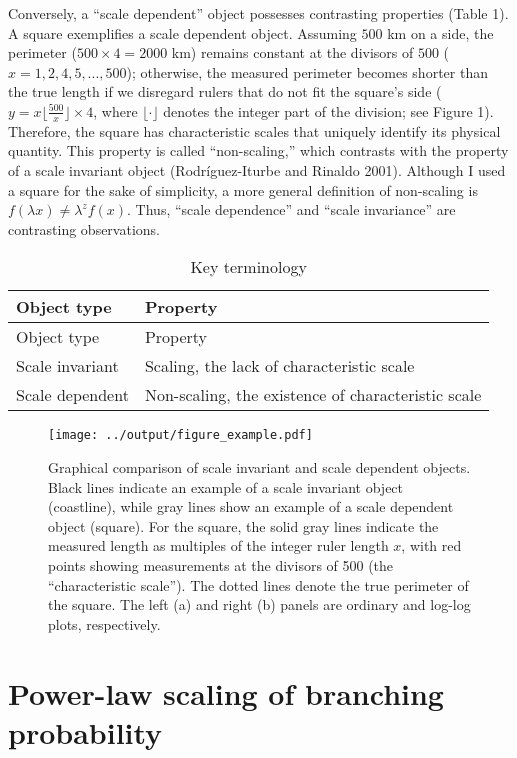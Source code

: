 \documentclass[
  12pt,
]{article}
\begin{document}
Conversely, a ``scale dependent'' object possesses contrasting properties (Table 1). A square exemplifies a scale dependent object. Assuming \(500\) km on a side, the perimeter (\(500 \times 4 =2000\) km) remains constant at the divisors of \(500\) (\(x = 1, 2, 4, 5,...,500\)); otherwise, the measured perimeter becomes shorter than the true length if we disregard rulers that do not fit the square's side (\(y = x \lfloor \frac{500}{x} \rfloor \times 4\), where \(\lfloor \cdot \rfloor\) denotes the integer part of the division; see Figure 1). Therefore, the square has characteristic scales that uniquely identify its physical quantity. This property is called ``non-scaling,'' which contrasts with the property of a scale invariant object (Rodríguez-Iturbe and Rinaldo 2001). Although I used a square for the sake of simplicity, a more general definition of non-scaling is \(f(\lambda x) \ne \lambda^zf(x)\). Thus, ``scale dependence'' and ``scale invariance'' are contrasting observations.

\begin{longtable}[]{@{}ll@{}}
\caption{Key terminology}\tabularnewline
\toprule()
Object type & Property \\
\midrule()
\endfirsthead
\toprule()
Object type & Property \\
\midrule()
\endhead
Scale invariant & Scaling, the lack of characteristic scale \\
Scale dependent & Non-scaling, the existence of characteristic scale \\
\bottomrule()
\end{longtable}

\begin{figure}
\centering
\texttt{[image: ../output/figure\_example.pdf]}
\caption{\label{fig:example}Graphical comparison of scale invariant and scale dependent objects. Black lines indicate an example of a scale invariant object (coastline), while gray lines show an example of a scale dependent object (square). For the square, the solid gray lines indicate the measured length as multiples of the integer ruler length \(x\), with red points showing measurements at the divisors of 500 (the ``characteristic scale''). The dotted lines denote the true perimeter of the square. The left (a) and right (b) panels are ordinary and log-log plots, respectively.}
\end{figure}

\hypertarget{power-law-scaling-of-branching-probability}{%
\section{Power-law scaling of branching probability}\label{power-law-scaling-of-branching-probability}}
\end{document}
